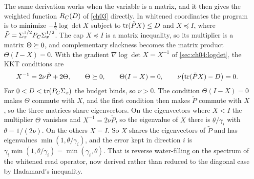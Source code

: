 
The same derivation works when the variable is a matrix, and it then gives the weighted function $R_C(D)$ of \cref{ch03} directly. In whitened coordinates the program is to minimize $-\frac12\log\det X$ subject to $\operatorname{tr}(\tilde PX)\le D$ and $X\preceq I$, where $\tilde P=\Sigma_x^{1/2}P_C\Sigma_x^{1/2}$. The cap $X\preceq I$ is a matrix inequality, so its multiplier is a matrix $\Theta\succeq0$, and complementary slackness becomes the matrix product $\Theta(I-X)=0$. With the gradient $\nabla\log\det X=X^{-1}$ of \cref{sec:ch04:logdet}, the KKT conditions are
\begin{equation}\label{eq:ch04:matrix-kkt}
X^{-1}=2\nu\tilde P+2\Theta,\qquad \Theta\succeq0,\qquad\Theta(I-X)=0,\qquad \nu\bigl(\operatorname{tr}(\tilde PX)-D\bigr)=0 .
\end{equation}
For $0<D<\operatorname{tr}(P_C\Sigma_x)$ the budget binds, so $\nu>0$. The condition $\Theta(I-X)=0$ makes $\Theta$ commute with $X$, and the first condition then makes $\tilde P$ commute with $X$, so the three matrices share eigenvectors. On the eigenvectors where $X<I$ the multiplier $\Theta$ vanishes and $X^{-1}=2\nu\tilde P$, so the eigenvalue of $X$ there is $\theta/\gamma_i$ with $\theta=1/(2\nu)$. On the others $X=I$. So $X$ shares the eigenvectors of $\tilde P$ and has eigenvalues $\min(1,\theta/\gamma_i)$, and the error kept in direction $i$ is $\gamma_i\min(1,\theta/\gamma_i)=\min(\gamma_i,\theta)$. That is reverse water-filling on the spectrum of the whitened read operator, now derived rather than reduced to the diagonal case by Hadamard's inequality.

